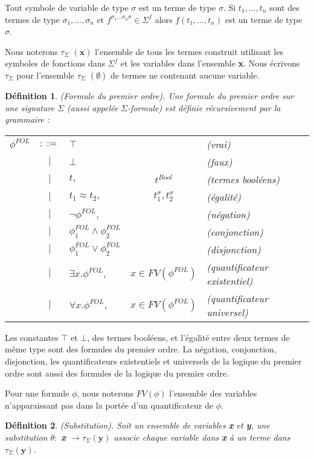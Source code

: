 \documentclass[11pt,openany]{article}
\newtheorem{definition}{D\'efinition}[subsection]
\begin{document}
	Tout symbole de variable de type $\sigma$ est un terme de type $\sigma$. Si $t_{1},\ldots,t_{n}$ sont des termes de type $\sigma_{1},\ldots,\sigma_{n}$ et $f^{\sigma_{1} \ldots\sigma_{n} \sigma} \in \Sigma^{f}$ alors $f(t_{1},\ldots,t_{n})$ est un terme de type $\sigma$.

Nous noterons $\tau_{\Sigma}$ $(\textbf{x})$ l'ensemble de tous les termes construit utilisant les symboles de fonctions dans $\Sigma^{f}$ et les variables dans l'ensemble \textbf{x}. Nous \'ecrivons $\tau_{\Sigma}$ pour l'ensemble $\tau_{\Sigma}$ $(\emptyset)$ de termes ne contenant aucune variable.
\begin{definition} 
(Formule du premier ordre). Une formule du premier ordre sur une signature $\Sigma$ (aussi appel\'ee $\Sigma$-formule) est d\'efinie r\'ecursivement par la grammaire :
\begin{tabular}{lclcl}
$\phi^{FOL}$ & $::=$ & $\top$ & & (vrai)\\
 & $|$ & $\bot$ & & (faux)\\
 & $|$ & $t,$ & $t^{Bool}$ & (termes bool\'eens)\\
 & $|$ & $t_{1} \approx t_{2},$ & $t_{1}^{\sigma},t_{2}^{\sigma}$ & (\'egalit\'e)\\
 & $|$ & $\neg\phi^{FOL},$ & & (n\'egation)\\
 & $|$ & $\phi_{1}^{FOL} \land \phi_{2}^{FOL}$ & & (conjonction)\\
 & $|$ & $\phi_{1}^{FOL} \lor \phi_{2}^{FOL}$ & & (disjonction)\\
 & $|$ & $\exists x.\phi^{FOL},$ & $x\in FV(\phi^{FOL})$ & (quantificateur existentiel)\\
 & $|$ & $\forall x.\phi^{FOL},$ & $x\in FV(\phi^{FOL})$ & (quantificateur universel)

\end{tabular}
\end{definition}
Les constantes $\top$ et $\bot$, des termes bool\'eens, et l'\'egalit\'e entre deux termes de m\^eme type sont des formules du premier ordre. La n\'egation, conjonction, disjonction, les quantificateurs existentiels et universels de la logique du premier ordre sont aussi des formules de la logique du premier ordre.

	Pour une formule $\phi$, nous noterons $FV(\phi)$ l'ensemble des variables n'apparaissant pas dans la port\'ee d'un quantificateur de $\phi$.

\begin{definition}
(Substitution). Soit un ensemble de variables \textbf{x} et \textbf{y}, une substitution $\theta :$ \textbf{x} $\rightarrow \tau_{\Sigma}(\textbf{y})$ associe chaque variable dans \textbf{x} \`a un terme dans $\tau_{\Sigma}(\textbf{y})$.
\end{definition}
\end{document}
